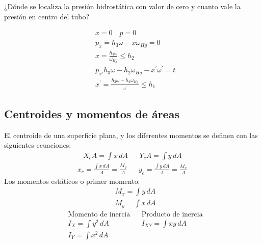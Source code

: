 \begin{problem}
    ¿Dónde se localiza la presión hidrostática con valor de cero y cuanto vale la presión en centro del tubo?
\end{problem}
\begin{align*}
    &x=0\quad p=0\\
    &p_x=h_3\omega -x\omega_{Hg}=0\\
    &x=\frac{h_3\omega}{\omega_{Hg}}\leq h_2\\
    &p_{x\prime}h_3\omega-h_2\omega_{Hg}-x^{\prime}\omega^{\prime}=t\\
    &x^{\prime}=\frac{h_3\omega-h_2\omega_{Hg}}{\omega^{\prime}}\leq h_1
\end{align*}

\subsection{Centroides y momentos de áreas}
El centroide de una superficie plana, y los diferentes momentos se definen con las siguientes ecuaciones:
\begin{align}
    X_cA=\int x\, dA&& Y_cA =\int y\, dA
\end{align}
\begin{align*}
    x_c=\frac{\int x\, dA}{A}=\frac{M_y}{A}&&y_c=\frac{\int y\, dA}{A}=\frac{M_x}{A}
\end{align*}
Los momentos estáticos o primer momento:
\begin{align*}
    &M_x=\int y\, dA\\
    &M_y=\int x\, dA
\end{align*}
\begin{align*}
    &\text{Momento de inercia}&&\text{Producto de inercia}\\
    &I_X=\int y^2\, dA&&I_{XY}=\int xy\, dA\\
    &I_Y=\int x^2\, dA&&
\end{align*}

